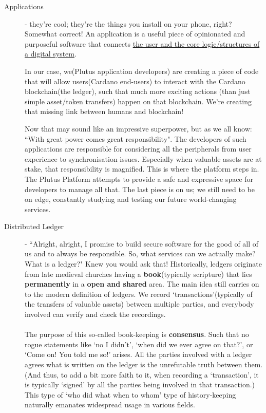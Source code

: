 \documentclass[a4paper, 11pt]{article}
\begin{document}
    \begin{description}
        \item[Applications] - they're cool; they're the things you install on your phone, right? Somewhat correct! An application is a useful piece of opinionated and purposeful software that connects \underline{the user and the core logic/structures of a digital system}.
        
        In our case, we(Plutus application developers) are creating a piece of code that will allow users(Cardano end-users) to interact with the Cardano blockchain(the ledger), such that much more exciting actions (than just simple asset/token transfers) happen on that blockchain. We're creating that missing link between humans and blockchain!
        
        Now that may sound like an impressive superpower, but as we all know: ``With great power comes great responsibility". The developers of such applications are responsible for considering all the peripherals from user experience to synchronisation issues. Especially when valuable assets are at stake, that responsibility is magnified. This is where the platform steps in. The Plutus Platform attempts to provide a safe and expressive space for developers to manage all that. The last piece is on us; we still need to be on edge, constantly studying and testing our future world-changing services.

        \item[Distributed Ledger] - ``Alright, alright, I promise to build secure software for the good of all of us and to always be responsible. So, what services can we actually make? What is a ledger?" Knew you would ask that! Historically, ledgers originate from late medieval churches having a \textbf{book}(typically scripture) that lies \textbf{permanently} in a \textbf{open and shared} area. The main idea still carries on to the modern definition of ledgers. We record `transactions'(typically of the transfers of valuable assets) between multiple parties, and everybody involved can verify and check the recordings. 
        
        \paragraph{}The purpose of this so-called book-keeping is \textbf{consensus}. Such that no rogue statements like `no I didn't', `when did we ever agree on that?', or `Come on! You told me so!' arises. All the parties involved with a ledger agrees what is written on the ledger is the unrefutable truth between them. (And thus, to add a bit more faith to it, when recording a `transaction', it is typically `signed' by all the parties being involved in that transaction.) This type of `who did what when to whom' type of history-keeping naturally emanates widespread usage in various fields. 
        

\end{description}
\end{document}
